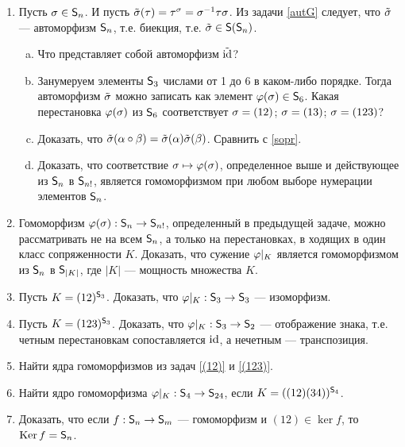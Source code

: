 \begin{enumerate}
\item Пусть $\sigma\in{\mathsf{S}}_n$. И пусть $\tilde{\sigma}(\tau)=\tau^\sigma=\sigma^{-1}\tau\sigma$. Из задачи \ref{autG} следует, что 
$\tilde{\sigma}$ --- автоморфизм ${\mathsf{S}}_n$, т.е. биекция, т.е. $\tilde{\sigma}\in {\mathsf{S}}({\mathsf{S}}_n)$.
\begin{enumerate}[a)]
\item Что представляет собой автоморфизм $\tilde{\mathrm{id}}$?
\item Занумеруем элементы ${\mathsf{S}}_3$ числами от 1 до 6 в каком-либо порядке. Тогда автоморфизм $\tilde{\sigma}$ можно записать как элемент $\varphi(\sigma)\in{\mathsf{S}}_6$. Какая перестановка $\varphi(\sigma)$ из ${\mathsf{S}}_6$ соответствует \ipunkt $\sigma=(12)$; \ipunkt $\sigma=(13)$; \ipunkt $\sigma=(123)$?
\item Доказать, что $\tilde{\sigma}(\alpha\circ\beta)=\tilde{\sigma}(\alpha)\tilde{\sigma}(\beta)$. Сравнить с \ref{sopr}.
\item Доказать, что соответствие $\sigma\mapsto\varphi(\sigma)$, определенное выше и действующее из ${\mathsf{S}}_n$ в ${\mathsf{S}}_{n!}$, является гомоморфизмом при любом выборе нумерации элементов ${\mathsf{S}}_n$.
\end{enumerate}

\item Гомоморфизм $\varphi(\sigma):{\mathsf{S}}_n\to{\mathsf{S}}_{n!}$, определенный в предыдущей задаче, можно рассматривать не на всем ${\mathsf{S}}_n$, а только на перестановках, в ходящих в один класс сопряженности $K$. Доказать, что сужение $\varphi|_K$ является гомоморфизмом из ${\mathsf{S}}_n$ в ${\mathsf{S}}_{|K|}$, где $|K|$ --- мощность множества $K$.

\item Пусть $K=(12)^{{\mathsf{S}}_3}$. Доказать, что $\varphi|_K:{\mathsf{S}}_3\to{\mathsf{S}}_3$ --- изоморфизм.\label{(12)}

\item Пусть $K=(123)^{{\mathsf{S}}_3}$. Доказать, что $\varphi|_K:{\mathsf{S}}_3\to{\mathsf{S}}_2$ --- отображение знака, т.е. четным перестановкам сопоставляется $\mathrm{id}$, а нечетным --- транспозиция. \label{(123)}

\item Найти ядра гомоморфизмов из задач \ref{(12)} и \ref{(123)}.

\item Найти ядро гомоморфизма $\varphi|_K:{\mathsf{S}}_4\to{\mathsf{S}}_{24}$, если $K=((12)(34))^{{\mathsf{S}}_4}$.

\item Доказать, что если $f:{\mathsf{S}}_n\to{\mathsf{S}}_m$ --- гомоморфизм и $(12)\in\ker f$, то $\mathop{\mathrm{Ker}} f={\mathsf{S}}_n$.
\end{enumerate}







